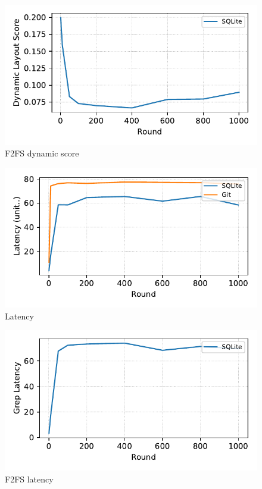 \begin{figure}[t]
    \centering
    \includegraphics[width=0.95\columnwidth]{graphs/py_graph/dynamic-f2fs}
    \caption{F2FS dynamic score}
    \label{f:f2fs_dynamic_score}
\end{figure}


\begin{figure}[t]
    \centering
    \includegraphics[width=0.95\columnwidth]{graphs/py_graph/latency}
    \caption{Latency}
    \label{f:latency}
\end{figure}

\begin{figure}[t]
    \centering
    \includegraphics[width=0.95\columnwidth]{graphs/py_graph/latency-f2fs}
    \caption{F2FS latency}
    \label{f:f2fs_latency}
\end{figure}



